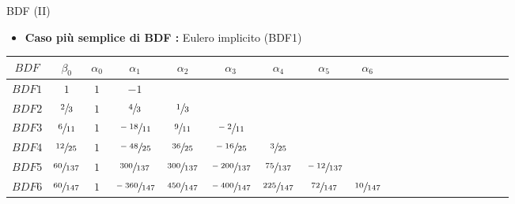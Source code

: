 \documentclass[aspectratio=169, 10pt, handout,usenames,dvipsnames]{beamer}
\begin{document}
    \begin{frame}{BDF (II)}
        \begin{itemize}
            \item \textbf{Caso più semplice di BDF :} Eulero implicito (BDF1)
        \end{itemize}
        
        \begin{table}[]
            \begin{tabular}{Sc|Sc|Sc|ScScScScScScSc}
            \( BDF \)& \(\beta_0\) & \(\alpha_0\) & \(\alpha_1\) & \(\alpha_2\)  & \(\alpha_3\) & \(\alpha_4\) & \(\alpha_5\) & \(\alpha_6\) \\
            \hline
            \(BDF1\)& \(1 \)       & \(1 \) & \(-1\)       &                             &          &         &         &        \\
            \(BDF2\)& \(\sfrac{2}{3} \)    & \(1\) & \(\sfrac{4}{3} \)     & \(\sfrac{1}{3} \)                         &          &         &         &        \\
            \(BDF3\)& \(\sfrac{6}{11} \)   & \(1\) & \(\sfrac{-18}{11} \)   & \(\sfrac{9}{11} \)                       & \(\sfrac{-2}{11}\)    &         &         &        \\
            \(BDF4\)& \(\sfrac{12}{25} \)  & \(1\) & \(\sfrac{-48}{25} \)   & \(\sfrac{36}{25} \)   & \(\sfrac{-16}{25}\)   & \(\sfrac{3}{25}\)   &         &        \\
            \(BDF5\)& \(\sfrac{60}{137} \) & \(1\) & \(\sfrac{300}{137} \)  & \(\sfrac{300}{137}\) & \(\sfrac{-200}{137}\) & \(\sfrac{75}{137}\)  & \(\sfrac{-12}{137}\) &        \\
            \(BDF6\)& \(\sfrac{60}{147} \) & \(1\) & \(\sfrac{-360}{147} \) & \(\sfrac{450}{147}\) & \(\sfrac{-400}{147}\) & \(\sfrac{225}{147}\) & \(\sfrac{72}{147}\) & \(\sfrac{10}{147}\)
            \end{tabular}
        \end{table}
    \end{frame}
    
    
\end{document}
